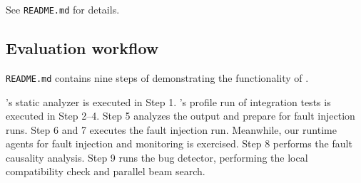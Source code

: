 See \texttt{README.md} for details.

\subsection{Evaluation workflow}

\texttt{README.md} contains nine steps of demonstrating the functionality of \tool. 

\tool's static analyzer is executed in Step 1.
\tool's profile run of integration tests is executed in Step 2--4. Step 5 analyzes the output and prepare \tool for fault injection runs. Step 6 and 7 executes the fault injection run. Meanwhile, our runtime agents for fault injection and monitoring is exercised. Step 8 performs the fault causality analysis. Step 9 runs the bug detector, performing the local compatibility check and parallel beam search.
